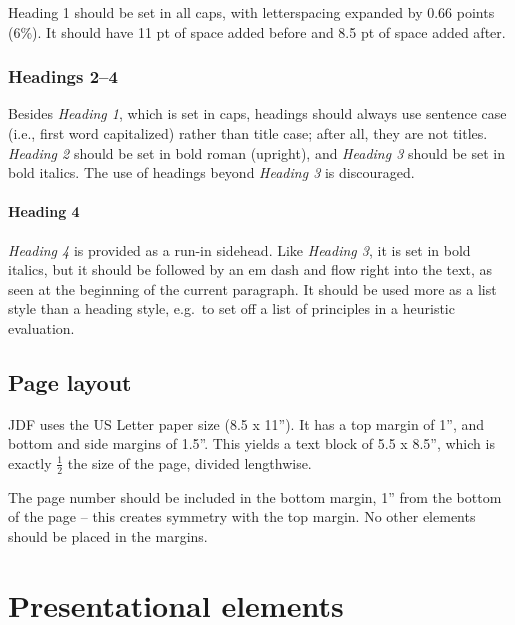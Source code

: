 \documentclass{jdf}
\begin{document}
Heading 1 should be set in all caps, with letterspacing expanded by 0.66
points (6\%). It should have 11 pt of space added before and 8.5 pt of
space added after.

\hypertarget{headings-24}{%
\subsubsection{Headings 2--4}\label{headings-24}}

Besides \emph{Heading 1}, which is set in caps, headings should always
use sentence case (i.e., first word capitalized) rather than title case;
after all, they are not titles. \emph{Heading 2} should be set in bold
roman (upright), and \emph{Heading 3} should be set in bold italics. The
use of headings beyond \emph{Heading 3} is discouraged.

\hypertarget{heading-4}{%
\paragraph{Heading 4}\label{heading-4}}

\emph{Heading 4} is provided as a run-in sidehead. Like \emph{Heading
3}, it is set in bold italics, but it should be followed by an em dash
and flow right into the text, as seen at the beginning of the current
paragraph. It should be used more as a list style than a heading style,
e.g.~to set off a list of principles in a heuristic evaluation.

\hypertarget{page-layout}{%
\subsection{Page layout}\label{page-layout}}

JDF uses the US Letter paper size (8.5 x 11''). It has a top margin of
1'', and bottom and side margins of 1.5''. This yields a text block of
5.5 x 8.5'', which is exactly \(\frac{1}{2}\) the size of the page,
divided lengthwise.

The page number should be included in the bottom margin, 1'' from the
bottom of the page -- this creates symmetry with the top margin. No
other elements should be placed in the margins.

\hypertarget{presentational-elements}{%
\section{Presentational elements}\label{presentational-elements}}
\end{document}
